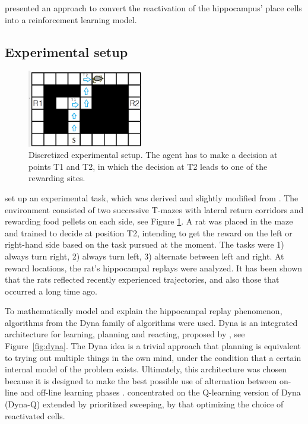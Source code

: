 \documentclass[a4paper]{article}
\begin{document}
	\par \citet{NeuralDynaQ} presented an approach to convert the reactivation of the hippocampus' place cells into a reinforcement learning model.  
	
	\subsection{Experimental setup}
		\begin{figure}[t]
		\centering
		\includegraphics[angle=0,width=0.45\textwidth]{./figs/setup.png}
		\caption{\label{fig:setup}Discretized experimental setup. The agent has to make a decision at points T1 and T2, in which the decision at T2 leads to one of the rewarding sites. \citep{NeuralDynaQ}}
	\end{figure}
\par \cite{NeuralDynaQ} set up an experimental task, which was derived and slightly modified from \cite{GUPTA2010695}. The environment consisted of two successive T-mazes with lateral return corridors and rewarding food pellets on each side, see Figure \ref{fig:setup}. A rat was placed in the maze and trained to decide at position T2, intending to get the reward on the left or right-hand side based on the task pursued at the moment. The tasks were 1) always turn right, 2) always turn left, 3) alternate between left and right. At reward locations, the rat's hippocampal replays were analyzed. It has been shown that the rats reflected recently experienced trajectories, and also those that occurred a long time ago.
	

	
	\par To mathematically model and explain the hippocampal replay phenomenon, algorithms from the Dyna family of algorithms were used. Dyna is an integrated architecture for learning, planning and reacting, proposed by \cite{Dyna}, see Figure~\ref{fig:dyna}. The Dyna idea is a trivial approach that planning is equivalent to trying out multiple things in the own mind, under the condition that a certain internal model of the problem exists. Ultimately, this architecture was chosen because it is designed to make the best possible use of alternation between on-line and off-line learning phases \citep{Dyna}. \cite{NeuralDynaQ} concentrated on the Q-learning version of Dyna (Dyna-Q) extended by prioritized sweeping, by that optimizing the choice of reactivated cells.
	
\end{document}
